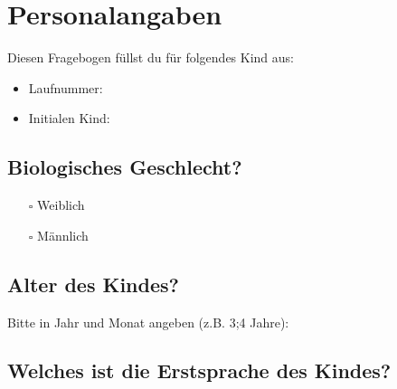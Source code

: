 \documentclass[
  ngerman,
  11pt,
  paper=a4,
  twoside,
  titlepage=true,
  openright,
  abstract=on,
  toc=listofnumbered,
  numbers=noenddot,
  chapterprefix=true,
  headings=optiontohead,
  svgnames,
  dvipsnames]{scrreprt}
\providecommand{\tightlist}{%
  \setlength{\itemsep}{0pt}\setlength{\parskip}{0pt}}
\begin{document}
\hypertarget{personalangaben-1}{%
\section*{Personalangaben}\label{personalangaben-1}}

Diesen Fragebogen füllst du für folgendes Kind aus:

\begin{itemize}
\tightlist
\item
  Laufnummer: \xhrule[,fill=2cm,thickness=0.5pt]
\item
  Initialen Kind: \xhrule[,fill=2cm,thickness=0.5pt]
\end{itemize}

\hypertarget{biologisches-geschlecht}{%
\subsection*{Biologisches Geschlecht?}\label{biologisches-geschlecht}}

\begin{itemize}
\tightlist
\item[$\square$]
  Weiblich
\item[$\square$]
  Männlich
\end{itemize}

\hypertarget{alter-des-kindes}{%
\subsection*{Alter des Kindes?}\label{alter-des-kindes}}

Bitte in Jahr und Monat angeben (z.B. 3;4 Jahre):
\xhrule[,fill=3cm,thickness=0.5pt]

\hypertarget{welches-ist-die-erstsprache-des-kindes}{%
\subsection*{Welches ist die Erstsprache des
Kindes?}\label{welches-ist-die-erstsprache-des-kindes}}
\end{document}
